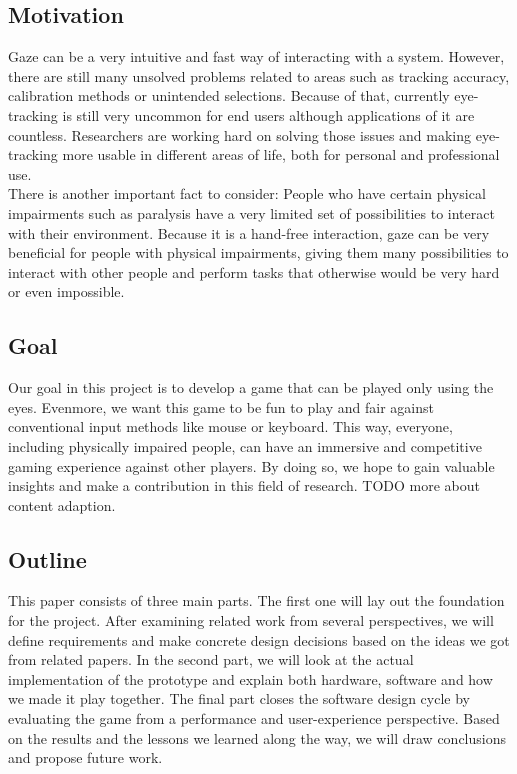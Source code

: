 \documentclass{sigchi}
\begin{document}
\subsection{Motivation}
Gaze can be a very intuitive and fast way of interacting with a system. However, there are still many unsolved problems related to areas such as tracking accuracy, calibration methods or unintended selections. Because of that, currently eye-tracking is still very uncommon for end users although applications of it are countless. Researchers are working hard on solving those issues and making eye-tracking more usable in different areas of life, both for personal and professional use.\\
There is another important fact to consider: People who have certain physical impairments such as paralysis have a very limited set of possibilities to interact with their environment. Because it is a hand-free interaction, gaze can be very beneficial for people with physical impairments, giving them many possibilities to interact with other people and perform tasks that otherwise would be very hard or even impossible.

\subsection{Goal}
Our goal in this project is to develop a game that can be played only using the eyes. Evenmore, we want this game to be fun to play and fair against conventional input methods like mouse or keyboard. This way, everyone, including physically impaired people, can have an immersive and competitive gaming experience against other players. By doing so, we hope to gain valuable insights and make a contribution in this field of research. TODO more about content adaption.

\subsection{Outline}
This paper consists of three main parts. The first one will lay out the foundation for the project. After examining related work from several perspectives, we will define requirements and make concrete design decisions based on the ideas we got from related papers. In the second part, we will look at the actual implementation of the prototype and explain both hardware, software and how we made it play together. The final part closes the software design cycle by evaluating the game from a performance and user-experience perspective. Based on the results and the lessons we learned along the way, we will draw conclusions and propose future work.
\end{document}
